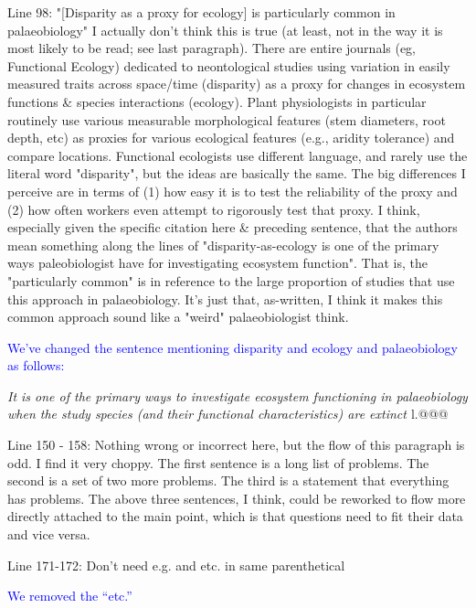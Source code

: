 \documentclass[12pt,letterpaper]{article}
\begin{document}
\noindent Line 98: "[Disparity as a proxy for ecology] is particularly common in palaeobiology" I actually don't think this is true (at least, not in the way it is most likely to be read; see last paragraph). There are entire journals (eg, Functional Ecology) dedicated to neontological studies using variation in easily measured traits across space/time (disparity) as a proxy for changes in ecosystem functions \& species interactions (ecology). Plant physiologists in particular routinely use various measurable morphological features (stem diameters, root depth, etc) as proxies for various ecological features (e.g., aridity tolerance) and compare locations. 
Functional ecologists use different language, and rarely use the literal word "disparity", but the ideas are basically the same. The big differences I perceive are in terms of (1) how easy it is to test the reliability of the proxy and (2) how often workers even attempt to rigorously test that proxy. 
I think, especially given the specific citation here \& preceding sentence, that the authors mean something along the lines of "disparity-as-ecology is one of the primary ways paleobiologist have for investigating ecosystem function". That is, the "particularly common" is in reference to the large proportion of studies that use this approach in palaeobiology. It's just that, as-written, I think it makes this common approach sound like a "weird" palaeobiologist think.

\textcolor{blue}{We've changed the sentence mentioning disparity and ecology and palaeobiology as follows:}

\textit{It is one of the primary ways to investigate ecosystem functioning in palaeobiology when the study species (and their functional characteristics) are extinct \citep{Wainwright2005}} l.@@@

\noindent Line 150 - 158: Nothing wrong or incorrect here, but the flow of this paragraph is odd. I find it very choppy. The first sentence is a long list of problems. The second is a set of two more problems. The third is a statement that everything has problems. The above three sentences, I think, could be reworked to flow more directly attached to the main point, which is that questions need to fit their data and vice versa.


\noindent Line 171-172: Don't need e.g. and etc. in same parenthetical

\textcolor{blue}{We removed the  ``etc.''}
\end{document}
